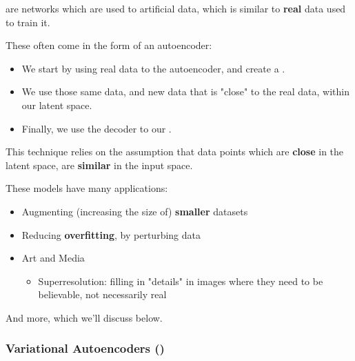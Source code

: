         \begin{definition}
             are networks which are used to  artificial data, which is similar to \textbf{real} data used to train it.

            These often come in the form of an autoencoder: 
            \begin{itemize}
                \item We start by using real data to  the autoencoder, and create a .
                \item We use those same data, and  new data that is "close" to the real data, within our latent space.
                \item Finally, we use the decoder to  our .
            \end{itemize}

            \subsecdiv

            This technique relies on the assumption that data points which are \textbf{close} in the latent space, are \textbf{similar} in the input space.
        \end{definition}

        These models have many applications:

        \begin{itemize}
            \item Augmenting (increasing the size of) \textbf{smaller} datasets 
            \item Reducing \textbf{overfitting}, by perturbing data
            \item Art and Media
                \begin{itemize}
                    \item \miniex Superresolution: filling in "details" in images where they need to be believable, not necessarily real
                \end{itemize}
            
        \end{itemize}

        And more, which we'll discuss below.

        \subsubsection{Variational Autoencoders ()}

